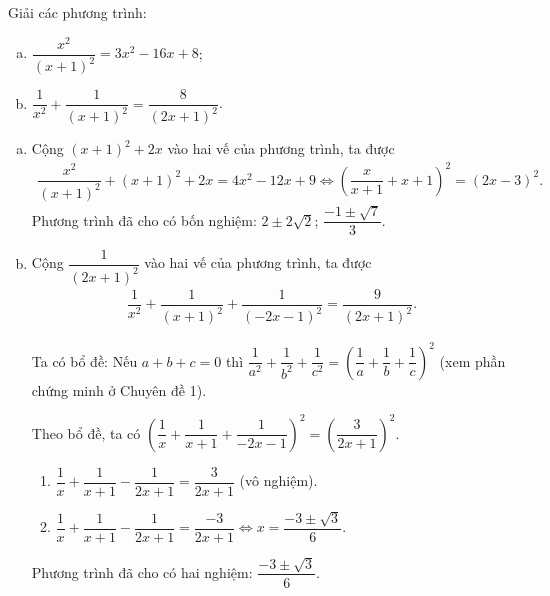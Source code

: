 	\begin{bt}
		Giải các phương trình:
		\begin{multicols}{2}
			\begin{enumerate}[a)]
				\item $\dfrac{x^2}{(x+1)^2} = 3x^2 - 16x + 8$;
				\item $\dfrac{1}{x^2} + \dfrac{1}{(x+1)^2} = \dfrac{8}{(2x+1)^2}$.
			\end{enumerate}
		\end{multicols}
		\loigiai 
		{
			\begin{enumerate}[a)]
				\item Cộng $(x+1)^2 + 2x$ vào hai vế của phương trình, ta được
					\begin{align*}
						\dfrac{x^2}{(x+1)^2} + (x+1)^2 + 2x = 4x^2-12x+9 \Leftrightarrow \left(\dfrac{x}{x+1} + x + 1\right)^2 = (2x-3)^2.
					\end{align*}
					Phương trình đã cho có bốn nghiệm: $2 \pm 2\sqrt{2}$; $\dfrac{-1 \pm \sqrt{7}}{3}$.
				\item Cộng $\dfrac{1}{(2x+1)^2}$ vào hai vế của phương trình, ta được
					\begin{align*}
						\dfrac{1}{x^2} + \dfrac{1}{(x+1)^2} + \dfrac{1}{(-2x-1)^2} = \dfrac{9}{(2x+1)^2}.
					\end{align*}
					\begin{note}
						Ta có bổ đề: Nếu $a+b+c=0$ thì $\dfrac{1}{a^2} + \dfrac{1}{b^2} + \dfrac{1}{c^2} = \left(\dfrac{1}{a} + \dfrac{1}{b} + \dfrac{1}{c}\right)^2$ (xem phần chứng minh ở Chuyên đề 1).
					\end{note}
					Theo bổ đề, ta có $\left(\dfrac{1}{x} + \dfrac{1}{x+1} + \dfrac{1}{-2x-1}\right)^2 = \left(\dfrac{3}{2x+1}\right)^2$.
					\begin{enumerate}[TH1:]
						\item $\dfrac{1}{x} + \dfrac{1}{x+1} - \dfrac{1}{2x+1} = \dfrac{3}{2x+1}$ (vô nghiệm).
						\item $\dfrac{1}{x} + \dfrac{1}{x+1} - \dfrac{1}{2x+1} = \dfrac{-3}{2x+1} \Leftrightarrow x = \dfrac{-3 \pm \sqrt{3}}{6}$.
					\end{enumerate}
					Phương trình đã cho có hai nghiệm: $\dfrac{-3 \pm \sqrt{3}}{6}$.
			\end{enumerate}
		}
	\end{bt}





